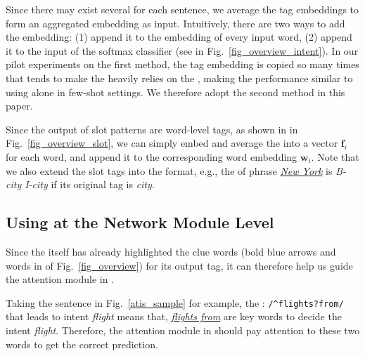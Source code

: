 Since there may exist several \REtags for each sentence, we average the tag embeddings to form an aggregated embedding as input.
Intuitively, there are two ways to add the embedding: (1) append it to the embedding of every input word, (2) append it to the input of the softmax classifier (see  in Fig.~\ref{fig_overview_intent}).
In our pilot experiments on the first method, the tag embedding is copied so many times that tends to make the \NN heavily relies on the \REtags, making the performance similar to using \RE alone in few-shot settings. We therefore adopt the second method in this paper.

Since the output of slot \RE patterns are word-level tags, as shown in  in Fig.~\ref{fig_overview_slot}, we can simply embed
and average the \REtags into a vector $\textbf{f}_i$ for each word, and append it to the corresponding word embedding $\textbf{w}_i$.
Note that we also extend the slot \RE tags into the \BIO format, e.g.,
the \REtag of phrase \textsl{\underline{New York}} is \emph{B-city I-city} if its original tag is \emph{city}.

\subsection{Using \REs at the Network Module Level}
\label{interact_with_module}
Since the \RE itself has already highlighted the clue words (bold blue arrows and words in  of Fig.~\ref{fig_overview}) for its output tag, it can therefore help us guide the attention module in \NN.

Taking the sentence in Fig.~\ref{atis_sample} for example, the \RE: {\small\texttt{/\textasciicircum flights?\:from/} } that leads to intent \emph{flight} means that, \textsl{\underline{flights from}} are key words to decide the intent \emph{flight}. Therefore, the attention module in \NN should pay attention to these two words to get the correct prediction.

